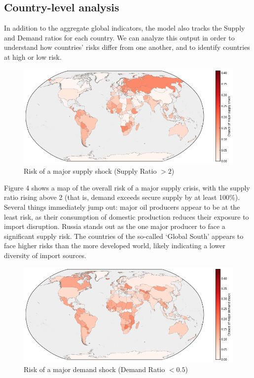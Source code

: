\documentclass{llncs}
\begin{document}
\subsection{Country-level analysis}

In addition to the aggregate global indicators, the model also tracks the Supply and Demand ratios for each country. We can analyze this output in order to understand how countries' risks differ from one another, and to identify countries at high or low risk.

\begin{figure}[h!]
	\centering
	\includegraphics[width=\textwidth]{Figures/SupplyShockMap}
	\caption{Risk of a major supply shock (Supply Ratio $>2$)}

\end{figure}

Figure 4 shows a map of the overall risk of a major supply crisis, with the supply ratio rising above 2 (that is, demand exceeds secure supply by at least 100\%). Several things immediately jump out: major oil producers appear to be at the least risk, as their consumption of domestic production reduces their exposure to import disruption. Russia stands out as the one major producer to face a significant supply risk. The countries of the so-called `Global South' appears to face higher risks than the more developed world, likely indicating a lower diversity of import sources.

\begin{figure}[h!]
	\centering
	\includegraphics[width=\textwidth]{Figures/DemandShockMap}
	\caption{Risk of a major demand shock (Demand Ratio $<0.5$)}

\end{figure}
\end{document}
